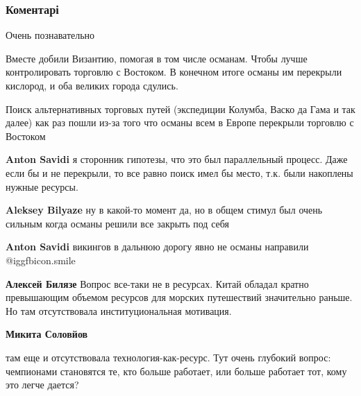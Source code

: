  
 
 
 
 
\subsubsection{Коментарі}
\label{sec:02_11_2021.fb.biljaze_aleksej.1.povest_o_dvuh_gorodah.cmt}

\begin{itemize} %
Очень познавательно


Вместе добили Византию, помогая в том числе османам. Чтобы лучше контролировать
торговлю с Востоком. В конечном итоге османы им перекрыли кислород, и оба
великих города сдулись.

Поиск альтернативных торговых путей (экспедиции Колумба, Васко да Гама и так
далее) как раз пошли из-за того что османы всем в Европе перекрыли торговлю с
Востоком

\begin{itemize} %
\textbf{Anton Savidi} я сторонник гипотезы, что это был параллельный процесс. Даже если бы и не перекрыли, то все равно поиск имел бы место, т.к. были накоплены нужные ресурсы.

\textbf{Aleksey Bilyaze} ну в какой-то момент да, но в общем стимул был очень сильным когда османы решили все закрыть под себя

\textbf{Anton Savidi} викингов в дальнюю дорогу явно не османы направили  @igg{fbicon.smile} 


\textbf{Алексей Билязе} Вопрос все-таки не в ресурсах. Китай обладал кратно превышающим объемом ресурсов для морских путешествий значительно раньше. Но там отсутствовала институциональная мотивация.

\textbf{Микита Соловйов} 

там еще и отсутствовала технология-как-ресурс. Тут очень глубокий вопрос:
чемпионами становятся те, кто больше работает, или больше работает тот, кому
это легче дается?



\end{itemize}
\end{itemize}
